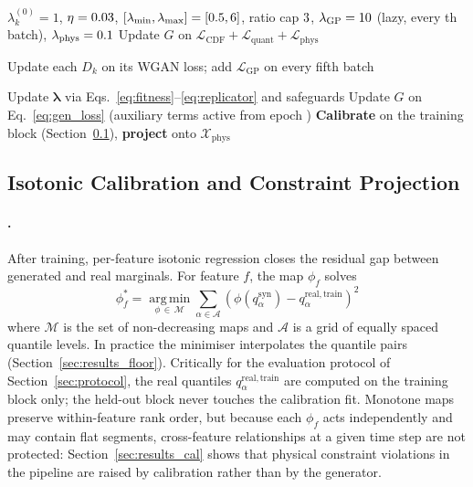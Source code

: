\documentclass[preprint,12pt]{elsarticle}
\makeatletter
\let\ElsParagraph\paragraph
\def\StripRunInStop#1.\StripRunInMark#2\StripRunInEnd{#1}
\let\StripRunInMark\@empty
\renewcommand\paragraph[1]{\ElsParagraph{\StripRunInStop#1\StripRunInMark.\StripRunInMark\StripRunInEnd}}
\newcommand\AlgWrap[1]{\parbox[t]{\dimexpr\linewidth-\ALG@thistlm\relax}{#1\strut}}
\newcommand{\Lc}{\mathcal{L}}
\newcommand{\blambda}{\boldsymbol{\lambda}}
\newcommand{\argmin}{\operatorname*{arg\,min}}
\makeatother
\begin{document}
\begin{algorithm}[t]
\caption{StatD2GAN training}
\label{alg:training}
\begin{algorithmic}[1]
\Require $\lambda_k^{(0)} = 1$, $\eta = 0.03$,
         $[\lambda_{\min},\lambda_{\max}] = [0.5, 6]$,
         ratio cap $3$,
         $\lambda_{\mathrm{GP}} = 10$ (lazy, every
         \protoGpFreq{}th batch), $\lambda_{\mathrm{phys}} = 0.1$
  
    \State Update $G$ on
           $\Lc_{\mathrm{CDF}} + \Lc_{\mathrm{quant}} + \Lc_{\mathrm{phys}}$
\EndFor
{}  
            \State \AlgWrap{Update each $D_k$ on its WGAN loss;
                   add $\Lc_{\mathrm{GP}}$ on every fifth batch}
        \EndFor
        \State Update $\blambda$ via
               Eqs.~\eqref{eq:fitness}--\eqref{eq:replicator} and safeguards
        \State Update $G$ on Eq.~\eqref{eq:gen_loss}
               (auxiliary terms active from epoch \codeAuxStart)
    \EndFor
\EndFor
\State \textbf{Calibrate} on the training block
       (Section~\ref{sec:calibration}), \textbf{project} onto
       $\mathcal{X}_{\mathrm{phys}}$
\end{algorithmic}
\end{algorithm}

\subsection{Isotonic Calibration and Constraint Projection}
\label{sec:calibration}

\paragraph{Calibration.}
After training, per-feature isotonic regression
\cite{barlow1972isotonic} closes the residual gap between generated and
real marginals.  For feature $f$, the map $\phi_f$ solves
\begin{equation}
  \phi_f^*
    = \argmin_{\phi\,\in\,\mathcal{M}}
      \sum_{\alpha \in \mathcal{A}}
      \left(\phi\!\left(q_\alpha^{\mathrm{syn}}\right)
            - q_\alpha^{\mathrm{real,train}}\right)^{\!2}
  \label{eq:isotonic}
\end{equation}
where $\mathcal{M}$ is the set of non-decreasing maps and $\mathcal{A}$
is a grid of \protoNQuantiles{} equally spaced quantile levels.  In
practice the minimiser interpolates the quantile pairs
(Section~\ref{sec:results_floor}).  Critically for the
evaluation protocol of Section~\ref{sec:protocol}, the real quantiles
$q_\alpha^{\mathrm{real,train}}$ are computed on the training block
only; the held-out block never touches the calibration fit.  Monotone
maps preserve within-feature rank order, but because each $\phi_f$ acts
independently and may contain flat segments, cross-feature relationships
at a given time step are not protected: Section~\ref{sec:results_cal}
shows that physical constraint violations in the pipeline are raised
by calibration rather than by the generator.
\end{document}
